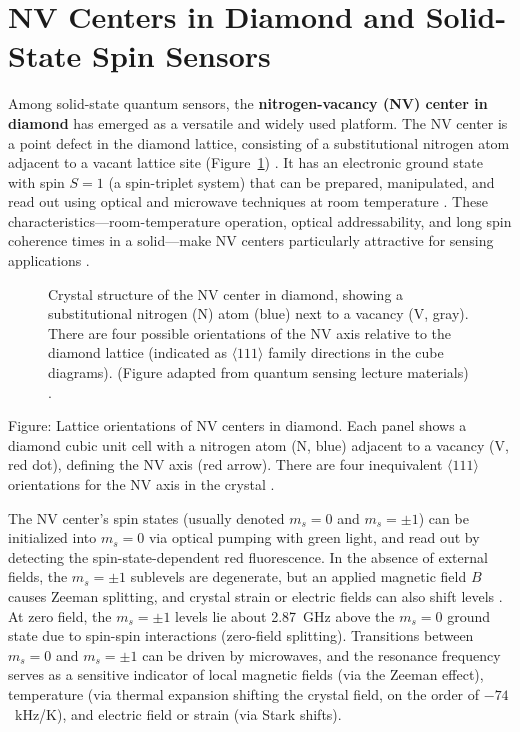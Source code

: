 \section{NV Centers in Diamond and Solid-State Spin Sensors}\label{sec:NV}

Among solid-state quantum sensors, the \textbf{nitrogen-vacancy (NV)
  center in diamond} has emerged as a versatile and widely used
platform. The NV center is a point defect in the diamond lattice,
consisting of a substitutional nitrogen atom adjacent to a vacant
lattice site (Figure~\ref{fig:NV}) . It has an electronic ground state
with spin $S=1$ (a spin-triplet system) that can be prepared,
manipulated, and read out using optical and microwave techniques at
room temperature . These characteristics—room-temperature operation,
optical addressability, and long spin coherence times in a solid—make
NV centers particularly attractive for sensing applications .



\begin{figure}[h]

\centering

\caption{Crystal structure of the NV center in diamond, showing a substitutional nitrogen (N) atom (blue) next to a vacancy (V, gray). There are four possible orientations of the NV axis relative to the diamond lattice (indicated as $\langle 111 \rangle$ family directions in the cube diagrams). (Figure adapted from quantum sensing lecture materials) .}

\label{fig:NV}

\end{figure}



Figure: Lattice orientations of NV centers in diamond. Each panel
shows a diamond cubic unit cell with a nitrogen atom (N, blue)
adjacent to a vacancy (V, red dot), defining the NV axis (red
arrow). There are four inequivalent $\langle 111 \rangle$ orientations
for the NV axis in the crystal .



The NV center’s spin states (usually denoted $m_s = 0$ and $m_s =
\pm1$) can be initialized into $m_s=0$ via optical pumping with green
light, and read out by detecting the spin-state-dependent red
fluorescence. In the absence of external fields, the $m_s=\pm1$
sublevels are degenerate, but an applied magnetic field $B$ causes
Zeeman splitting, and crystal strain or electric fields can also shift
levels . At zero field, the $m_s=\pm1$ levels lie about 2.87~GHz above
the $m_s=0$ ground state due to spin-spin interactions (zero-field
splitting). Transitions between $m_s=0$ and $m_s=\pm1$ can be driven
by microwaves, and the resonance frequency serves as a sensitive
indicator of local magnetic fields (via the Zeeman effect),
temperature (via thermal expansion shifting the crystal field, on the
order of $-74$~kHz/K), and electric field or strain (via Stark
shifts).



